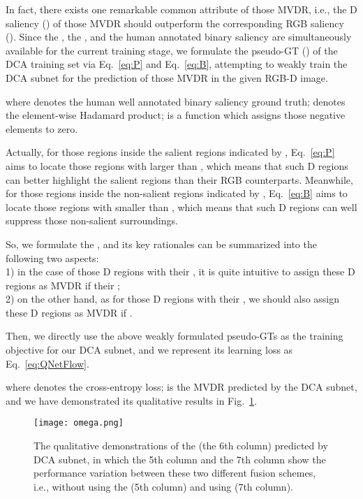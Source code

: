 \documentclass[journal]{IEEEtran}
\begin{document}
In fact, there exists one remarkable common attribute of those MVDR, i.e., the D saliency () of those MVDR should outperform the corresponding RGB saliency ().
Since the , the , and the human annotated binary saliency  are simultaneously available for the current training stage, we formulate the pseudo-GT () of the DCA training set via Eq.~\ref{eq:P} and Eq.~\ref{eq:B}, attempting to weakly train the DCA subnet for the prediction of those MVDR in the given RGB-D image.



where  denotes the human well annotated binary saliency ground truth;  denotes the element-wise Hadamard product;  is a function which assigns those negative elements to zero.

Actually, for those regions inside the salient regions indicated by , Eq.~\ref{eq:P} aims to locate those regions with larger  than , which means that such D regions can better highlight the salient regions than their RGB counterparts.
Meanwhile, for those regions inside the non-salient regions indicated by , Eq.~\ref{eq:B} aims to locate those regions with smaller  than , which means that such D regions can well suppress those non-salient surroundings.

So, we formulate the , and its key rationales can be summarized into the following two aspects:\\
1) in the case of those D regions with their , it is quite intuitive to assign these D regions as MVDR if their ;\\
2) on the other hand, as for those D regions with their , we should also assign these D regions as MVDR if .

Then, we directly use the above weakly formulated pseudo-GTs as the training objective for our DCA subnet, and we represent its learning loss as Eq.~\ref{eq:QNetFlow}.

where  denotes the cross-entropy loss;  is the MVDR predicted by the DCA subnet, and we have demonstrated its qualitative results in Fig.~\ref{fig:omega}.


\begin{figure}[t]
\centering
\texttt{[image: omega.png]} \caption{The qualitative demonstrations of the  (the 6th column) predicted by DCA subnet, in which the 5th column and the 7th column show the performance variation between these two different fusion schemes, i.e., without using the  (5th column) and using  (7th column).}
\label{fig:omega}
\end{figure}
\end{document}

